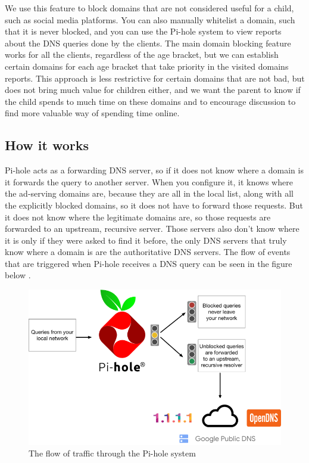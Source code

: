 We use this feature to block domains that are not considered useful for a child, such as social media platforms. You can also manually whitelist a domain, such that it is never blocked, and you can use the Pi-hole system to view reports about the DNS queries done by the clients. The main domain blocking feature works for all the clients, regardless of the age bracket, but we can establish certain domains for each age bracket that take priority in the visited domains reports. This approach is less restrictive for certain domains that are not bad, but does not bring much value for children either, and we want the parent to know if the child spends to much time on these domains and to encourage discussion to find more valuable way of spending time online.

\subsection{How it works}

Pi-hole acts as a forwarding DNS server, so if it does not know where a domain is it forwards the query to another server. When you configure it, it knows where the ad-serving domains are, because they are all in the local list, along with all the explicitly blocked domains, so it does not have to forward those requests. But it does not know where the legitimate domains are, so those requests are forwarded to an upstream, recursive server. Those servers also don't know where it is only if they were asked to find it before, the only DNS servers that truly know where a domain is are the authoritative DNS servers. The flow of events that are triggered when Pi-hole receives a DNS query can be seen in the figure below \citep{salmela2017ftldns}.

\begin{figure}[th]
\centering
\includegraphics[width=1\textwidth]{Figures/pihole-dns}
\decoRule
\caption{The flow of traffic through the Pi-hole system}
\label{fig:pihole-dns}
\end{figure}

